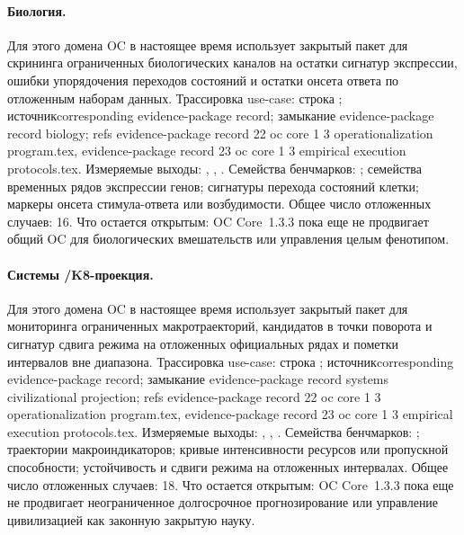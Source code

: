 \paragraph{Биология.}
Для этого домена OC в настоящее время использует закрытый пакет для скрининга ограниченных биологических каналов на остатки сигнатур экспрессии, ошибки упорядочения переходов состояний и остатки онсета ответа по отложенным наборам данных.
Трассировка use-case: строка ; \allowbreak источникcorresponding evidence-package record; \allowbreak замыкание evidence-package record biology; \allowbreak refs evidence-package record 22 oc core 1 3 operationalization program.tex, \allowbreak evidence-package record 23 oc core 1 3 empirical execution protocols.tex.
Измеряемые выходы: , , .
Семейства бенчмарков: ; семейства временных рядов экспрессии генов; сигнатуры перехода состояний клетки; маркеры онсета стимула-ответа или возбудимости.
Общее число отложенных случаев: 16.
Что остается открытым: OC Core~1.3.3 пока еще не продвигает общий OC для биологических вмешательств или управления целым фенотипом.

\paragraph{Системы /\allowbreak K8-проекция.}
Для этого домена OC в настоящее время использует закрытый пакет для мониторинга ограниченных макротраекторий, кандидатов в точки поворота и сигнатур сдвига режима на отложенных официальных рядах и пометки интервалов вне диапазона.
Трассировка use-case: строка ; \allowbreak источникcorresponding evidence-package record; \allowbreak замыкание evidence-package record systems civilizational projection; \allowbreak refs evidence-package record 22 oc core 1 3 operationalization program.tex, \allowbreak evidence-package record 23 oc core 1 3 empirical execution protocols.tex.
Измеряемые выходы: , , .
Семейства бенчмарков: ; траектории макроиндикаторов; кривые интенсивности ресурсов или пропускной способности; устойчивость и сдвиги режима на отложенных интервалах.
Общее число отложенных случаев: 18.
Что остается открытым: OC Core~1.3.3 пока еще не продвигает неограниченное долгосрочное прогнозирование или управление цивилизацией как законную закрытую науку.

